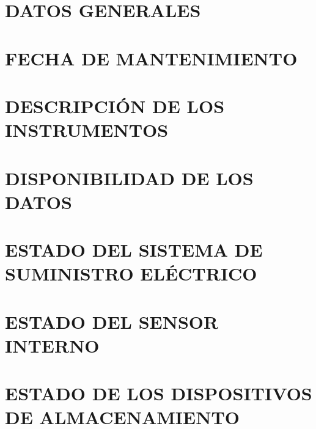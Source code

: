 \documentclass[a4paper, 12pt, final]{article}
\begin{document}
	

	\tableofcontents
	\newpage

	\section{DATOS GENERALES}
	

	\section{FECHA DE MANTENIMIENTO}
	

	\section{DESCRIPCIÓN DE LOS INSTRUMENTOS}

	\section{DISPONIBILIDAD DE LOS DATOS}

	\section{ESTADO DEL SISTEMA DE SUMINISTRO ELÉCTRICO}

	\section{ESTADO DEL SENSOR INTERNO}

	\section{ESTADO DE LOS DISPOSITIVOS DE ALMACENAMIENTO}
\end{document}
